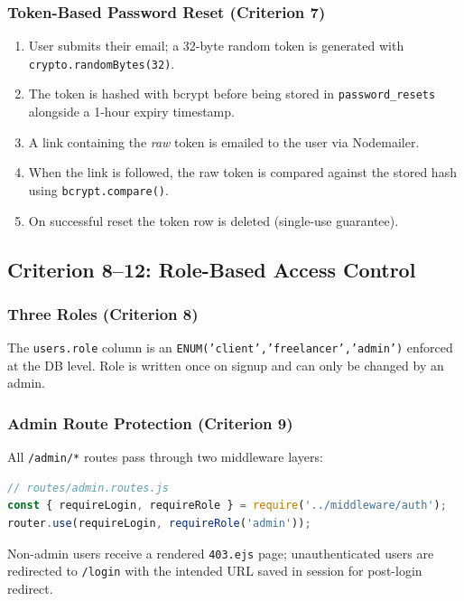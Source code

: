 \documentclass[12pt,a4paper]{article}
\begin{document}
\subsubsection{Token-Based Password Reset (Criterion 7)}

\begin{enumerate}[noitemsep]
  \item User submits their email; a 32-byte random token is generated with \texttt{crypto.randomBytes(32)}.
  \item The token is hashed with bcrypt before being stored in \texttt{password\_resets} alongside a 1-hour expiry timestamp.
  \item A link containing the \emph{raw} token is emailed to the user via Nodemailer.
  \item When the link is followed, the raw token is compared against the stored hash using \texttt{bcrypt.compare()}.
  \item On successful reset the token row is deleted (single-use guarantee).
\end{enumerate}

\subsection{Criterion 8--12: Role-Based Access Control}

\subsubsection{Three Roles (Criterion 8)}

The \texttt{users.role} column is an \texttt{ENUM('client','freelancer','admin')} enforced at the DB level. Role is written once on signup and can only be changed by an admin.

\subsubsection{Admin Route Protection (Criterion 9)}

All \texttt{/admin/*} routes pass through two middleware layers:

\begin{lstlisting}[language=JavaScript, caption={Admin route guard}]
// routes/admin.routes.js
const { requireLogin, requireRole } = require('../middleware/auth');
router.use(requireLogin, requireRole('admin'));
\end{lstlisting}

Non-admin users receive a rendered \texttt{403.ejs} page; unauthenticated users are redirected to \texttt{/login} with the intended URL saved in session for post-login redirect.
\end{document}
